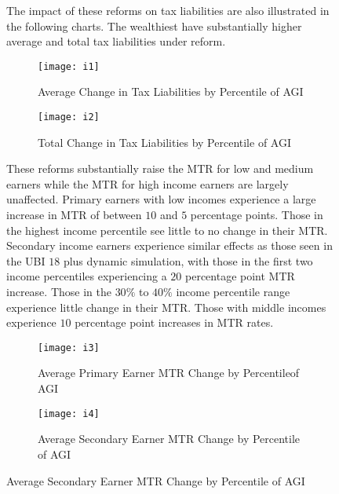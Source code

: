 \documentclass{article}
\begin{document}
\begin{figure}[H]
\begin{table}[H]
\caption{Change in Tax Liabilities by Percentile of AGI}

\begin{center}
\begin{adjustbox}{max width=\textwidth}

\end{adjustbox}
\end{center}
\end{table}

The impact of these reforms on tax liabilities are also illustrated in the following charts. The wealthiest have substantially higher average and total tax liabilities under reform.

\begin{figure}[H]
\centering
\caption{Average Change in Tax Liabilities by Percentile of AGI}
\texttt{[image: i1]}
\end{figure}

\begin{figure}[H]
\centering
\caption{Total Change in Tax Liabilities by Percentile of AGI}
\texttt{[image: i2]}
\end{figure}

These reforms substantially raise the MTR for low and medium earners while the MTR for high income earners are largely unaffected.
Primary earners with low incomes experience a large increase in MTR of between $10$ and $5$ percentage points. Those in the highest income percentile see little to no change in their MTR. Secondary income earners experience similar effects as those seen in the UBI $18$ plus dynamic simulation, with those in the first two income percentiles experiencing a $20$ percentage point MTR increase. Those in the $30\%$ to $40\%$ income percentile range experience little change in their MTR. Those with middle incomes experience $10$ percentage point increases in MTR rates.

\begin{figure}[H]
\centering
\caption{Average Primary Earner MTR Change by Percentileof AGI}
\texttt{[image: i3]}
\end{figure}

\begin{figure}[H]
\centering
\caption{Average Secondary Earner MTR Change by Percentile of AGI}
\texttt{[image: i4]}
\end{figure}


\end{figure}
\end{document}
